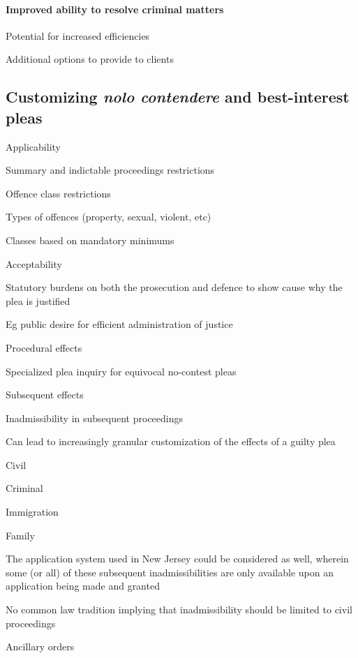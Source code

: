 \paragraph{Improved ability to resolve criminal matters\\}

Potential for increased efficiencies

Additional options to provide to clients

\subsection{Customizing \textit{nolo contendere} and best-interest pleas}

Applicability

Summary and indictable proceedings restrictions

Offence class restrictions

Types of offences (property, sexual, violent, etc)

Classes based on mandatory minimums

Acceptability

Statutory burdens on both the prosecution and defence to show cause why the plea is justified

Eg public desire for efficient administration of justice

Procedural effects

Specialized plea inquiry for equivocal no-contest pleas

Subsequent effects

Inadmissibility in subsequent proceedings

Can lead to increasingly granular customization of the effects of a guilty plea

Civil

Criminal

Immigration

Family

The application system used in New Jersey could be considered as well, wherein some (or all) of these subsequent inadmissibilities are only available upon an application being made and granted

No common law tradition implying that inadmissibility should be limited to civil proceedings

Ancillary orders